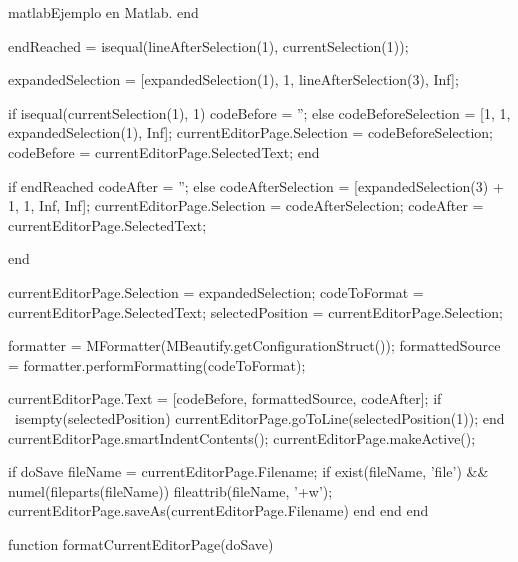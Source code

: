 \begin{sourcecode}{matlab}{Ejemplo en Matlab.}
            end
            
            endReached = isequal(lineAfterSelection(1), currentSelection(1));
            
            expandedSelection = [expandedSelection(1), 1, lineAfterSelection(3), Inf];
            
            if isequal(currentSelection(1), 1)
                codeBefore = '';
            else
                codeBeforeSelection = [1, 1, expandedSelection(1), Inf];
                currentEditorPage.Selection = codeBeforeSelection;
                codeBefore = currentEditorPage.SelectedText;
            end
            
            if endReached
                codeAfter = '';
            else
                codeAfterSelection = [expandedSelection(3) + 1, 1, Inf, Inf];
                currentEditorPage.Selection = codeAfterSelection;
                codeAfter = currentEditorPage.SelectedText;
                
            end
            
            currentEditorPage.Selection = expandedSelection;
            codeToFormat = currentEditorPage.SelectedText;
            selectedPosition = currentEditorPage.Selection;
            
            formatter = MFormatter(MBeautify.getConfigurationStruct());
            formattedSource = formatter.performFormatting(codeToFormat);
            
            currentEditorPage.Text = [codeBefore, formattedSource, codeAfter];
            if ~isempty(selectedPosition)
                currentEditorPage.goToLine(selectedPosition(1));
            end
            currentEditorPage.smartIndentContents();
            currentEditorPage.makeActive();
            
            if doSave
                fileName = currentEditorPage.Filename;
                if exist(fileName, 'file') && numel(fileparts(fileName))
                    fileattrib(fileName, '+w');
                    currentEditorPage.saveAs(currentEditorPage.Filename)
                end
            end
        end
        
        function formatCurrentEditorPage(doSave)
            

\end{sourcecode}
